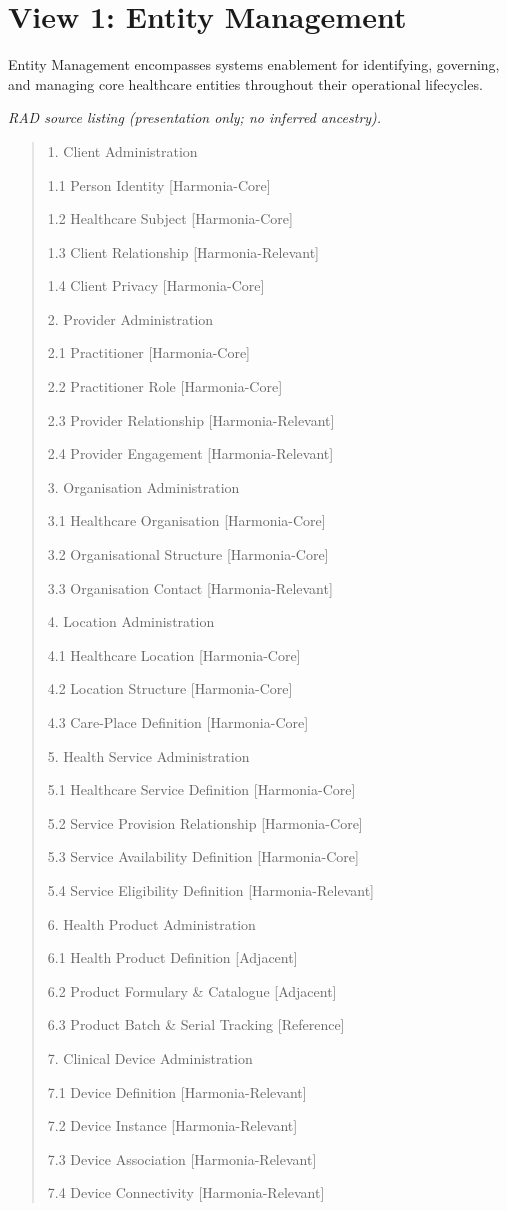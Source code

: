 \par\smallskip
{}\label{rad:enabling:71}
\section*{View 1: Entity Management}
\label{rad:enabling:73}

Entity Management encompasses systems enablement for identifying, governing, and managing core healthcare entities throughout their operational lifecycles.

\label{rad:enabling:75}

\textit{RAD source listing (presentation only; no inferred ancestry).}
\begin{quote}
1. Client Administration

1.1 Person Identity [Harmonia-Core]

1.2 Healthcare Subject [Harmonia-Core]

1.3 Client Relationship [Harmonia-Relevant]

1.4 Client Privacy [Harmonia-Core]

2. Provider Administration

2.1 Practitioner [Harmonia-Core]

2.2 Practitioner Role [Harmonia-Core]

2.3 Provider Relationship [Harmonia-Relevant]

2.4 Provider Engagement [Harmonia-Relevant]

3. Organisation Administration

3.1 Healthcare Organisation [Harmonia-Core]

3.2 Organisational Structure [Harmonia-Core]

3.3 Organisation Contact [Harmonia-Relevant]

4. Location Administration

4.1 Healthcare Location [Harmonia-Core]

4.2 Location Structure [Harmonia-Core]

4.3 Care-Place Definition [Harmonia-Core]

5. Health Service Administration

5.1 Healthcare Service Definition [Harmonia-Core]

5.2 Service Provision Relationship [Harmonia-Core]

5.3 Service Availability Definition [Harmonia-Core]

5.4 Service Eligibility Definition [Harmonia-Relevant]

6. Health Product Administration

6.1 Health Product Definition [Adjacent]

6.2 Product Formulary \& Catalogue [Adjacent]

6.3 Product Batch \& Serial Tracking [Reference]

7. Clinical Device Administration

7.1 Device Definition [Harmonia-Relevant]

7.2 Device Instance [Harmonia-Relevant]

7.3 Device Association [Harmonia-Relevant]

7.4 Device Connectivity [Harmonia-Relevant]
\end{quote}
